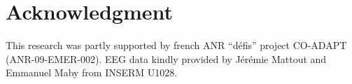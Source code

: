 \documentclass[conference]{IEEEtran}
\begin{document}


\section*{Acknowledgment}
This research was partly supported by french ANR ``d\'efis'' project CO-ADAPT (ANR-09-EMER-002).
EEG data kindly provided by J\'er\'emie Mattout and Emmanuel Maby from INSERM U1028. 



\end{document}
